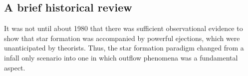 \documentclass[12pt]{mythesis}
\begin{document}


\subsection{A brief historical review}
It was not until about 1980 that there was sufficient observational evidence to show 
that star formation was accompanied by powerful ejections, which were unanticipated by theorists. Thus, the star formation paradigm changed from a infall only scenario into one in which outflow phenomena was a fundamental aspect. %
\end{document}
